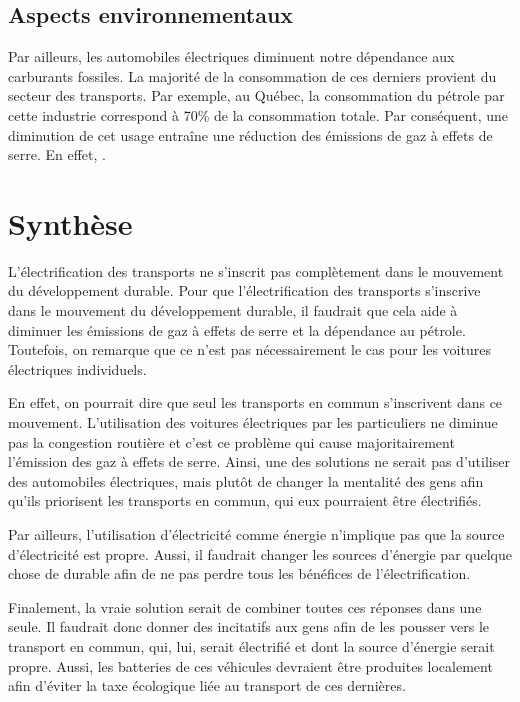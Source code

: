 \subsection{Aspects environnementaux}

Par ailleurs, les automobiles électriques diminuent notre dépendance aux carburants fossiles. La majorité de la consommation de ces derniers provient du secteur des transports. Par exemple, au Québec, la consommation du pétrole par cette industrie correspond à 70\% de la consommation totale. Par conséquent, une diminution de cet usage entraîne une réduction des émissions de gaz à effets de serre. En effet, .

\section{Synthèse}

L'électrification des transports ne s'inscrit pas complètement dans le mouvement du développement durable. Pour que l'électrification des transports s'inscrive dans le mouvement du développement durable, il faudrait que cela aide à diminuer les émissions de gaz à effets de serre et la dépendance au pétrole. Toutefois, on remarque que ce n'est pas nécessairement le cas pour les voitures électriques individuels. 

En effet, on pourrait dire que seul les transports en commun s'inscrivent dans ce mouvement. L'utilisation des voitures électriques par les particuliers ne diminue pas la congestion routière et c'est ce problème qui cause majoritairement l'émission des gaz à effets de serre. Ainsi, une des solutions ne serait pas d'utiliser des automobiles électriques, mais plutôt de changer la mentalité des gens afin qu'ils priorisent les transports en commun, qui eux pourraient être électrifiés. 

Par ailleurs, l'utilisation d'électricité comme énergie n'implique pas que la source d'électricité est propre. Aussi, il faudrait changer les sources d'énergie par quelque chose de durable afin de ne pas perdre tous les bénéfices de l'électrification. 

Finalement, la vraie solution serait de combiner toutes ces réponses dans une seule. Il faudrait donc donner des incitatifs aux gens afin de les pousser vers le transport en commun, qui, lui, serait électrifié et dont la source d'énergie serait propre. Aussi, les batteries de ces véhicules devraient être produites localement afin d'éviter la taxe écologique liée au transport de ces dernières.
